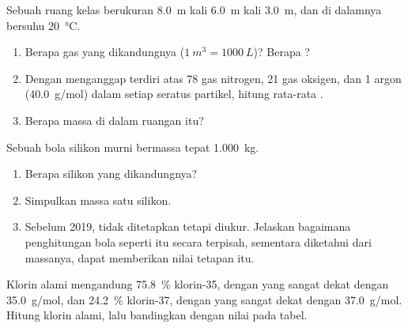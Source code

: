 \begin{exercise}[$\star\star\star$]\label{exo:g10:the-mole:13}
Sebuah ruang kelas berukuran \qty{8.0}{m} kali \qty{6.0}{m} kali
\qty{3.0}{m}, dan  di dalamnya bersuhu \qty{20}{\celsius}.
\begin{enumerate}
  \item Berapa  gas yang dikandungnya ($\qty{1}{m^3} =
        \qty{1000}{L}$)? Berapa ?
  \item Dengan menganggap  terdiri atas 78  gas nitrogen, 21
         gas oksigen, dan 1  argon (\qty{40.0}{g/mol}) dalam
        setiap seratus partikel, hitung  rata-rata .
  \item Berapa massa  di dalam ruangan itu?
\end{enumerate}
\end{exercise}

\begin{exercise}[$\star\star\star$]\label{exo:g10:the-mole:14}
Sebuah bola silikon murni bermassa tepat \qty{1.000}{kg}.
\begin{enumerate}
  \item Berapa  silikon yang dikandungnya?
  \item Simpulkan massa satu  silikon.
  \item Sebelum 2019,  tidak ditetapkan tetapi diukur.
        Jelaskan bagaimana penghitungan  bola seperti itu secara
        terpisah, sementara  diketahui dari massanya, dapat
        memberikan nilai tetapan itu.
\end{enumerate}
\end{exercise}

\begin{exercise}[$\star\star\star$]\label{exo:g10:the-mole:15}
Klorin alami mengandung \qty{75.8}{\percent}  klorin-35, dengan
 yang sangat dekat dengan \qty{35.0}{g/mol}, dan
\qty{24.2}{\percent}  klorin-37, dengan  yang sangat dekat
dengan \qty{37.0}{g/mol}. Hitung  klorin alami, lalu
bandingkan dengan nilai pada tabel.
\end{exercise}

